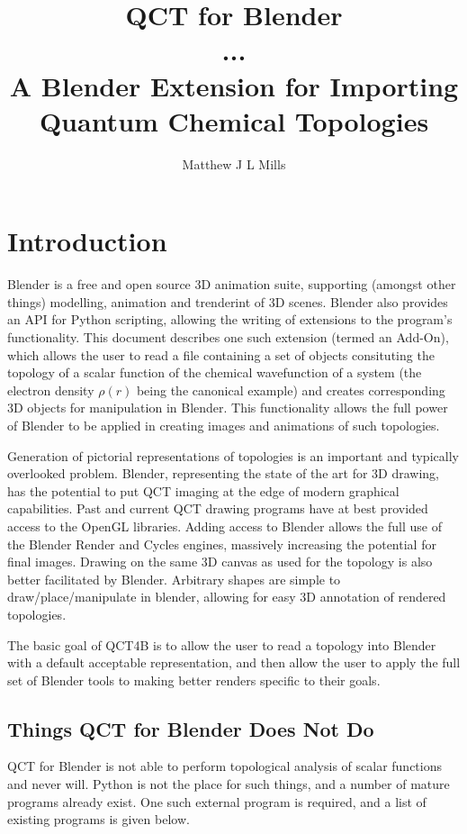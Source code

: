 \documentclass{report}
\title{QCT for Blender \\
       \large ... \\ 
       A Blender Extension for Importing Quantum Chemical Topologies}
\author{Matthew J L Mills}
\begin{document}
\maketitle

\chapter{Introduction}

Blender is a free and open source 3D animation suite, supporting (amongst other things) modelling, animation and trenderint of 3D scenes. 
Blender also provides an API for Python scripting, allowing the writing of extensions to the program's functionality.
This document describes one such extension (termed an Add-On), which allows the user to read a file containing a set of objects consituting the topology of a scalar function of the chemical wavefunction of a system (the electron density $\rho(r)$ being the canonical example) and creates corresponding 3D objects for manipulation in Blender.
This functionality allows the full power of Blender to be applied in creating images and animations of such topologies.

Generation of pictorial representations of topologies is an important and typically overlooked problem.
Blender, representing the state of the art for 3D drawing, has the potential to put QCT imaging at the edge of modern graphical capabilities.
Past and current QCT drawing programs have at best provided access to the OpenGL libraries.
Adding access to Blender allows the full use of the Blender Render and Cycles engines, massively increasing the potential for final images.
Drawing on the same 3D canvas as used for the topology is also better facilitated by Blender.
Arbitrary shapes are simple to draw/place/manipulate in blender, allowing for easy 3D annotation of rendered topologies.

The basic goal of QCT4B is to allow the user to read a topology into Blender with a default acceptable representation,
and then allow the user to apply the full set of Blender tools to making better renders specific to their goals.

\section{Things QCT for Blender Does Not Do}

QCT for Blender is not able to perform topological analysis of scalar functions and never will.
Python is not the place for such things, and a number of mature programs already exist.
One such external program is required, and a list of existing programs is given below.
\end{document}
